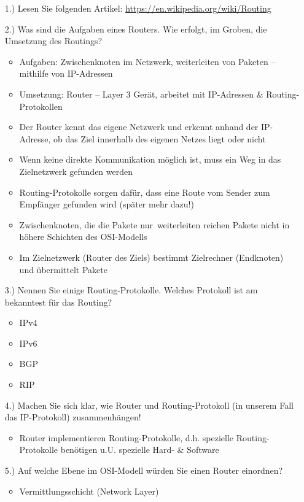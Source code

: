 \documentclass[paper=a4,fontsize=11pt]{scrartcl}%
\numberwithin{equation}{section}
\begin{document}
\begin{itemize}
	\item[1.)] Lesen Sie folgenden Artikel: \url{https://en.wikipedia.org/wiki/Routing}
	\item[2.)] Was sind die Aufgaben eines Routers. Wie erfolgt, im Groben, die Umsetzung des Routings?
	\begin{itemize}
		\item Aufgaben: Zwischenknoten im Netzwerk, weiterleiten von Paketen -- mithilfe von IP-Adressen
		\item Umsetzung: Router -- Layer 3 Gerät, arbeitet mit IP-Adressen \& Routing-Protokollen
		\item Der Router kennt das eigene Netzwerk und erkennt anhand der IP-Adresse, ob das Ziel innerhalb des eigenen Netzes liegt oder nicht
		\item Wenn keine direkte Kommunikation möglich ist, muss ein Weg in das Zielnetzwerk gefunden werden
		\item Routing-Protokolle sorgen dafür, dass eine Route vom Sender zum Empfänger gefunden wird (später mehr dazu!)
		\item Zwischenknoten, die die Pakete \glqq nur\grqq\ weiterleiten reichen Pakete nicht in höhere Schichten des OSI-Modells
		\item Im Zielnetzwerk (Router des Ziels) bestimmt Zielrechner (Endknoten) und übermittelt Pakete
	\end{itemize}
	\item[3.)] Nennen Sie einige Routing-Protokolle. Welches Protokoll ist am bekanntest für das Routing?
	\begin{itemize}
		\item IPv4
		\item IPv6
		\item BGP
		\item RIP
	\end{itemize}
	\item[4.)] Machen Sie sich klar, wie Router und Routing-Protokoll (in unserem Fall das IP-Protokoll) zusammenhängen!
	\begin{itemize}
		\item Router implementieren Routing-Protokolle, d.h. spezielle Routing-Protokolle benötigen u.U. spezielle Hard- \& Software 
	\end{itemize}
	\item[5.)] Auf welche Ebene im OSI-Modell würden Sie einen Router einordnen?
	\begin{itemize}
		\item Vermittlungsschicht (Network Layer)

\end{itemize}
\end{itemize}
\end{document}
